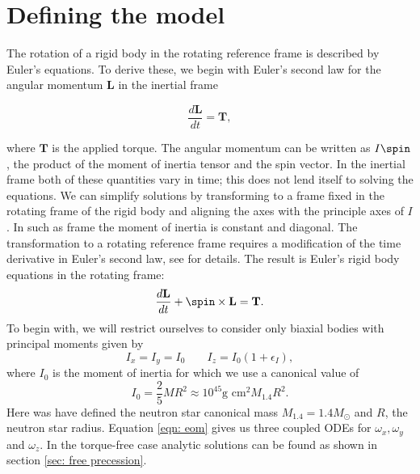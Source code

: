\documentclass[/home/greg/Thesis/main/main.tex]{subfiles}
\begin{document}
\section{Defining the model}

The rotation of a rigid body in the rotating reference frame is described by
Euler's equations. To derive these, we begin with Euler's second law  for the
angular momentum $\mathbf{L}$ in the inertial frame

\begin{equation}
    \frac{d\mathbf{L}}{dt}=\mathbf{T},
\end{equation}

where $\mathbf{T}$ is the applied torque. The angular momentum can be written
as $I \spin$, the product of the moment of inertia tensor and the spin vector.
In the inertial frame both of these quantities vary in time; this does not lend
itself to solving the equations. We can simplify solutions by transforming to a
frame fixed in the rotating frame of the rigid body and aligning the axes with
the principle axes of $I$. In such as frame the moment of inertia is constant
and diagonal. The transformation to a rotating reference frame requires a
modification of the time derivative in Euler's second law, see \citet{Landau1969}
for details. The result is Euler's rigid body equations in the rotating frame:
\begin{equation}
    \frac{d\mathbf{L}}{dt} + \spin \times \mathbf{L} = \mathbf{T}.
    \label{eqn: eom}
\end{equation}
To begin with, we will restrict ourselves to consider only biaxial bodies with 
principal moments given by
\begin{equation}
I_{x} = I_{y} = I_{0} \;\;\;\;\;\;\; I_{z} = I_{0}(1+\epsilon_{I}),
\end{equation}
where $I_{0}$ is the moment of inertia for which we use a canonical value of 
\begin{equation}
I_{0} = \frac{2}{5}MR^{2} \approx 10^{45}\textrm{g cm}^{2} M_{1.4}R^{2}.
\end{equation}
Here was have defined the neutron star canonical mass $M_{1.4} = 1.4 M_{\odot}$ 
and $R$, the neutron star radius.
Equation \ref{eqn: eom} gives us three coupled ODEs for $\omega_{x}, 
\omega_{y}$ and $\omega_{z}$. In the torque-free case analytic solutions can be
found as shown in section \ref{sec: free precession}.
\end{document}

